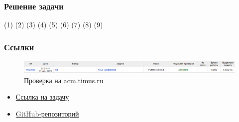 \documentclass[aspectratio=169]{beamer}
\begin{document}
\begin{frame}
		\frametitle{Решение задачи}
			 \newline	
			(1)\newline
			(2)\newline
			(3)\newline
			(4)\newline
			(5)\newline
			(6)\newline
		    (7)\newline
		    (8)\newline
			(9)\newline\newline
	\end{frame}
\begin{frame}
		\frametitle{Ссылки}
		\begin{figure}
			\includegraphics[scale=0.44]{accepted}
			\caption{Проверка на acm.timus.ru}
		\end{figure}
		\begin{itemize}
			\item \href{https://acm.timus.ru/problem.aspx?space=1&num=1654}{Ссылка на задачу}
			\item \href{https://github.com/IlyaDide/Practika}{GitHub-репозиторий}
		\end{itemize}
	\end{frame}
\end{document}
